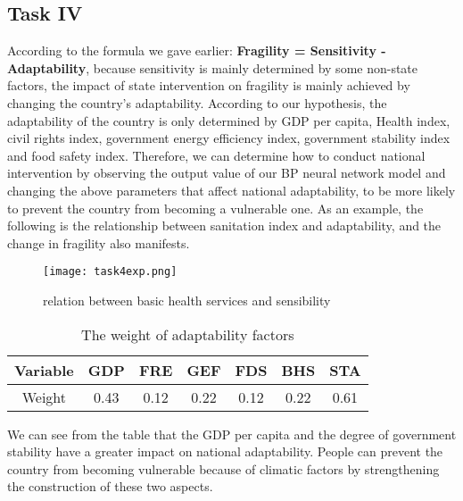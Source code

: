 \documentclass{mcmthesis}
\begin{document}
\subsection{Task IV}
According to the formula we gave earlier:
\textbf{Fragility = Sensitivity - Adaptability}, 
because sensitivity is mainly determined by some non-state 
factors, the impact of state intervention on fragility 
is mainly achieved by changing the country's adaptability. 
According to our hypothesis, the adaptability of the country 
is only determined by GDP per capita, Health index, civil 
rights index, government energy efficiency index, government 
stability index and food safety index. Therefore, we can 
determine how to conduct national intervention by observing 
the output value of our BP neural network model and changing 
the above parameters that affect national adaptability, to be 
more likely to prevent the country from becoming a vulnerable 
one. As an example, the following is the relationship between 
sanitation index and adaptability, and the change in fragility 
also manifests.
\newpage
\begin{figure}[htbp]
  \centering
  \texttt{[image: task4exp.png]}
  \caption{relation between basic health services and sensibility}
  \label{fig:sanitation}
\end{figure}
\begin{table}[h]
  \centering
  \begin{tabular} {|c|c|c|c|c|c|c|}  
  \hline  
  Variable & GDP & FRE & GEF & FDS & BHS & STA \\ \hline  
  Weight & 0.43 & 0.12 & 0.22 & 0.12 & 0.22 & 0.61  \\ \hline  
  \end{tabular}  
  \caption{The weight of adaptability factors}
\end{table}
We can see from the table that the GDP per capita and the 
degree of government stability have a greater impact on 
national adaptability. People can prevent the country from 
becoming vulnerable because of climatic factors by strengthening 
the construction of these two aspects.
\end{document}
